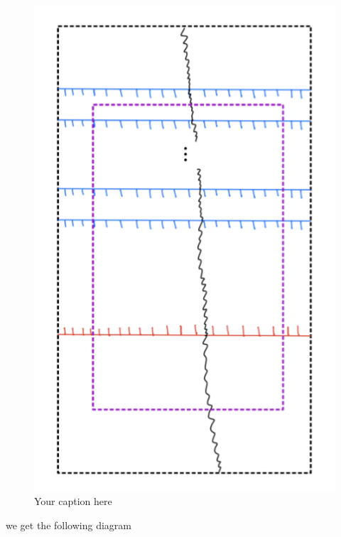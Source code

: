 \begin{figure}[H] %
    \centering
    \includegraphics[scale = 0.95]{diagrams/definition6/3.png} %
    \caption{Your caption here}
    \label{fig:your-label}
\end{figure}

we get the following diagram

